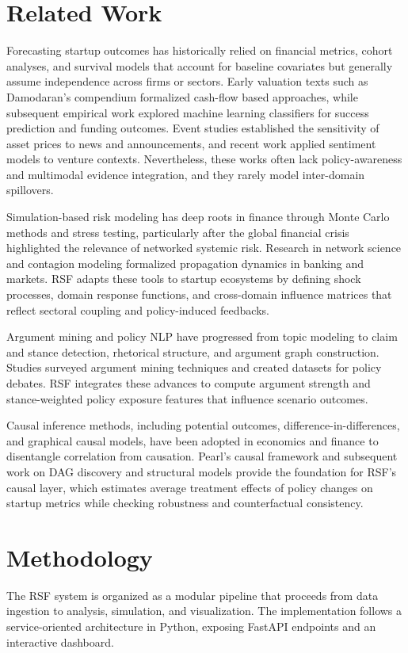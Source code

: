 \documentclass[conference]{IEEEtran}
\begin{document}
\section{Related Work}
Forecasting startup outcomes has historically relied on financial metrics, cohort analyses, and survival models that account for baseline covariates but generally assume independence across firms or sectors. Early valuation texts such as Damodaran's compendium formalized cash-flow based approaches, while subsequent empirical work explored machine learning classifiers for success prediction and funding outcomes. Event studies established the sensitivity of asset prices to news and announcements, and recent work applied sentiment models to venture contexts. Nevertheless, these works often lack policy-awareness and multimodal evidence integration, and they rarely model inter-domain spillovers.

Simulation-based risk modeling has deep roots in finance through Monte Carlo methods and stress testing, particularly after the global financial crisis highlighted the relevance of networked systemic risk. Research in network science and contagion modeling formalized propagation dynamics in banking and markets. RSF adapts these tools to startup ecosystems by defining shock processes, domain response functions, and cross-domain influence matrices that reflect sectoral coupling and policy-induced feedbacks.

Argument mining and policy NLP have progressed from topic modeling to claim and stance detection, rhetorical structure, and argument graph construction. Studies surveyed argument mining techniques and created datasets for policy debates. RSF integrates these advances to compute argument strength and stance-weighted policy exposure features that influence scenario outcomes.

Causal inference methods, including potential outcomes, difference-in-differences, and graphical causal models, have been adopted in economics and finance to disentangle correlation from causation. Pearl's causal framework and subsequent work on DAG discovery and structural models provide the foundation for RSF's causal layer, which estimates average treatment effects of policy changes on startup metrics while checking robustness and counterfactual consistency.

\section{Methodology}
The RSF system is organized as a modular pipeline that proceeds from data ingestion to analysis, simulation, and visualization. The implementation follows a service-oriented architecture in Python, exposing FastAPI endpoints and an interactive dashboard.
\end{document}
